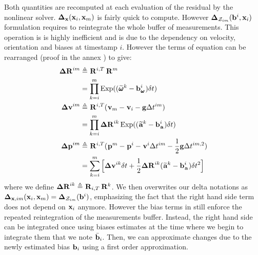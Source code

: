 Both quantities are recomputed at each evaluation of the residual by the nonlinear solver. ${\bm \Delta}_{{\bf x}}({\bf x}_i, {\bf x}_m)$ is fairly quick to compute.
However ${\bm \Delta}_{\mathcal{Z}_{im}}({\bf b}^i, {\bf x}_i)$ formulation requires to reintegrate the whole buffer of measurements. This operation is 
is highly inefficient and is due to the dependency on velocity, orientation and biases at timestamp $i$. However the terms of equation  can 
be rearranged (proof in the annex ) to give:
%
%
\begin{equation}
    \begin{split}
    {\bm \Delta {\bf R}}^{im} &\triangleq  \prescript{}{}{{\bf R}}_{}^{i,T} \prescript{}{}{{\bf R}}_{}^{m} \\
             &=  \prod_{k=i}^{m} \operatorname*{Exp}((\prescript{}{}{\widetilde{\pmb{\omega}}}_{}^k - {\bf b}_{\prescript{}{}{\pmb{\omega}}_{}}^i)\delta t) \\
    {\bm \Delta {\bf v}}^{im} &\triangleq \prescript{}{}{{\bf R}}_{}^{i,T} (\prescript{}{}{{\bf v}}_{m} - \prescript{}{}{{\bf v}}_{i} - {\bf g} \Delta t^{im}) \\
             &= \prod_{k=i}^{m} {\bm \Delta {\bf R}}^{ik} \operatorname*{Exp}((\prescript{}{}{\widetilde{{\bf a}}}_{}^k - {\bf b}_{\prescript{}{}{{\bf a}}_{}}^i)\delta t)  \\
    {\bm \Delta {\bf p}}^{im} &\triangleq \prescript{}{}{{\bf R}}_{}^{i,T}(\prescript{}{}{{\bf p}}_{}^m - \prescript{}{}{{\bf p}}_{}^i - \prescript{}{}{{\bf v}}_{}^i \Delta t^{im} - \frac{1}{2} {\bf g} \Delta t^{im,2}) \\
             &= \sum_{k=i}^{m} \Big[{\bm \Delta {\bf v}}^{ik}\delta t +  \frac{1}{2} {\bm \Delta {\bf R}}^{ik} (\prescript{}{}{\widetilde{{\bf a}}}_{}^k - {\bf b}_{\prescript{}{}{{\bf a}}_{}}^i)\delta t^2 \Big]
    \end{split}
    \label{eq:IMUPreintij}
\end{equation}
%
where we define ${\bm \Delta {\bf R}}^{ik} \triangleq \prescript{}{}{{\bf R}}_{i,T} \prescript{}{}{{\bf R}}_{}^k$.
We then overwrites our delta notations as ${\bm \Delta}_{{\bf x},im}({\bf x}_i, {\bf x}_m) = {\bm \Delta}_{\mathcal{Z}_{im}}({\bf b}^i)$,
emphasizing the fact that the right hand side term does not depend on ${\bf x}_i$ anymore. However the bias terms in  still enforce the repeated 
reintegration of the measurements buffer. Instead, the right hand side can be integrated once using biases estimates at the time where we begin to integrate them that
we note $\bar{{\bf b}}_i$. Then, we can approximate changes due to the newly estimated bias ${\bf b}_i$ using a first order approximation.

